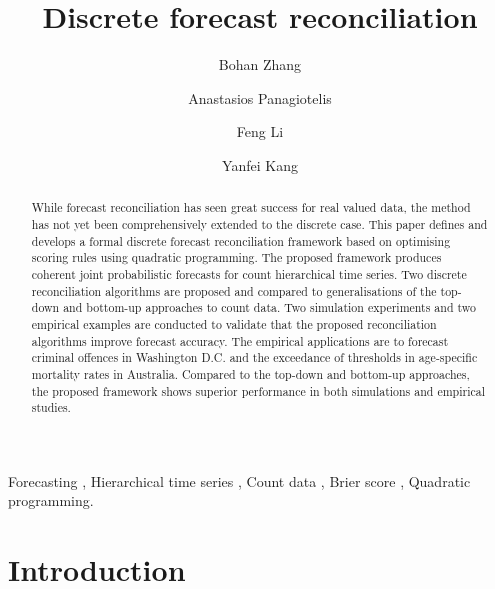 \documentclass[a4paper,review,12pt,authoryear]{elsarticle}
\theoremstyle{definition}
\begin{document}
\begin{frontmatter}

  \title{Discrete forecast reconciliation}

  \author[label1]{Bohan Zhang}
  \address[label1]{School of Economics and Management, Beihang University, Beijing, China}
  \author[label2]{Anastasios Panagiotelis}
  \author[label3]{Feng Li}

  \author[label1]{Yanfei Kang}
  \address[label2]{The University of Sydney Business School, NSW 2006, Australia}
  \address[label3]{School of Statistics and Mathematics, Central University of Finance and Economics, Beijing, China}

  \begin{abstract}

    While forecast reconciliation has seen great success for real valued data, the method has not yet been comprehensively extended to the discrete case. This paper defines and develops a formal discrete forecast reconciliation framework based on optimising scoring rules using quadratic programming. The proposed framework produces coherent joint probabilistic forecasts for count hierarchical time series.
    Two discrete reconciliation algorithms are proposed and compared to generalisations of the top-down and bottom-up approaches to count data. Two simulation experiments and two empirical examples are conducted to validate that the proposed reconciliation algorithms improve forecast accuracy. The empirical applications are to forecast  criminal offences in Washington D.C. and the exceedance of thresholds in age-specific mortality rates in Australia. Compared to the top-down and bottom-up approaches, the proposed framework shows superior performance in both simulations and empirical studies.

  \end{abstract}

  \begin{keyword}
  Forecasting \sep
  Hierarchical time series \sep
  Count data \sep
  Brier score \sep
  Quadratic programming.
  \end{keyword}

\end{frontmatter}

\newpage
\linenumbers

\section{Introduction}
\end{document}
